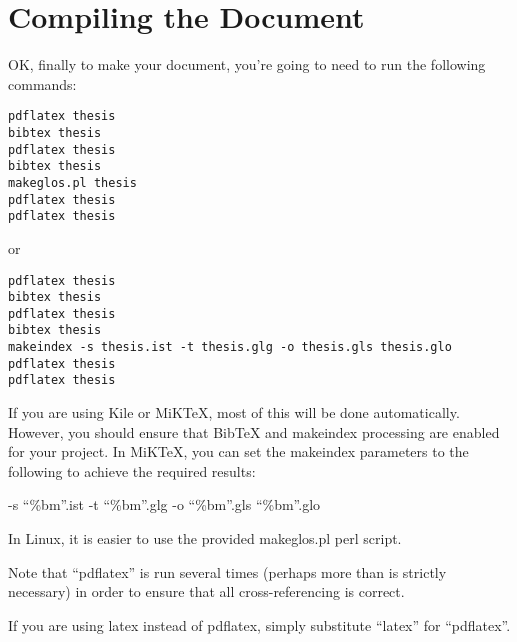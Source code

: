 
\chapter{Compiling the Document}
\label{ch:compiling}

OK, finally to make your document, you're going to need to run the following commands:

\small\singlespacing
\begin{verbatim}
pdflatex thesis
bibtex thesis
pdflatex thesis
bibtex thesis
makeglos.pl thesis
pdflatex thesis
pdflatex thesis
\end{verbatim}

\normalsize\doublespacing
or

\small\singlespacing
\begin{verbatim}
pdflatex thesis
bibtex thesis
pdflatex thesis
bibtex thesis
makeindex -s thesis.ist -t thesis.glg -o thesis.gls thesis.glo
pdflatex thesis
pdflatex thesis
\end{verbatim}

\normalsize\doublespacing

If you are using Kile or MiKTeX, most of this will be done automatically.  However, you should ensure that BibTeX and makeindex processing are enabled for your project.  In MiKTeX, you can set the makeindex parameters to the following to achieve the required results:

-s ``\%bm''.ist -t ``\%bm''.glg -o ``\%bm''.gls ``\%bm''.glo

In Linux, it is easier to use the provided makeglos.pl perl script.

Note that ``pdflatex'' is run several times (perhaps more than is strictly necessary) in order to ensure that all cross-referencing is correct.

If you are using latex instead of pdflatex, simply substitute ``latex'' for ``pdflatex''. 
